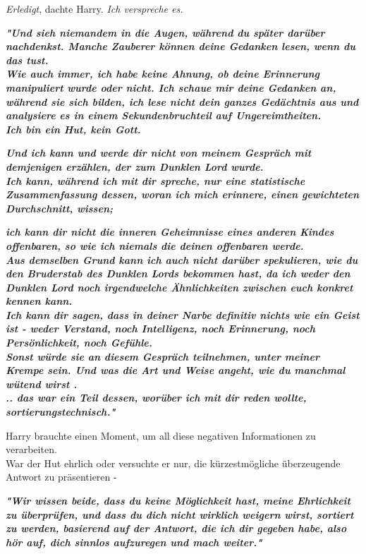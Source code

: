 {\emph{Erledigt}, dachte Harry. \emph{Ich verspreche es.}

\textbf{\emph{"Und sieh niemandem in die Augen, während du später darüber nachdenkst. Manche Zauberer können deine Gedanken lesen, wenn du das tust.\\ Wie auch immer, ich habe keine Ahnung, ob deine Erinnerung manipuliert wurde oder nicht. Ich schaue mir deine Gedanken an, während sie sich bilden, ich lese nicht dein ganzes Gedächtnis aus und analysiere es in einem Sekundenbruchteil auf Ungereimtheiten.}}\\ \textbf{\emph{\hfill\break Ich bin ein Hut, kein Gott.}}

\textbf{\emph{Und ich kann und werde dir nicht von meinem Gespräch mit demjenigen erzählen, der zum Dunklen Lord wurde.\\ Ich kann, während ich mit dir spreche, nur eine statistische Zusammenfassung dessen, woran ich mich erinnere, einen gewichteten Durchschnitt, wissen;}}

\textbf{\emph{ich kann dir nicht die inneren Geheimnisse eines anderen Kindes offenbaren, so wie ich niemals die deinen offenbaren werde.}}\\ \textbf{\emph{\hfill\break Aus demselben Grund kann ich auch nicht darüber spekulieren, wie du den Bruderstab des Dunklen Lords bekommen hast, da ich weder den Dunklen Lord noch irgendwelche Ähnlichkeiten zwischen euch konkret kennen kann.\\ Ich kann dir sagen, dass in deiner Narbe definitiv nichts wie ein Geist ist - weder Verstand, noch Intelligenz, noch Erinnerung, noch Persönlichkeit, noch Gefühle.\\ Sonst würde sie an diesem Gespräch teilnehmen, unter meiner Krempe sein. Und was die Art und Weise angeht, wie du manchmal wütend wirst .\\ .. das war ein Teil dessen, worüber ich mit dir reden wollte, sortierungstechnisch."}}

Harry brauchte einen Moment, um all diese negativen Informationen zu verarbeiten.\\ War der Hut ehrlich oder versuchte er nur, die kürzestmögliche überzeugende Antwort zu präsentieren -

\textbf{\emph{"Wir wissen beide, dass du keine Möglichkeit hast, meine Ehrlichkeit zu überprüfen, und dass du dich nicht wirklich weigern wirst, sortiert zu werden, basierend auf der Antwort, die ich dir gegeben habe, also hör auf, dich sinnlos aufzuregen und mach weiter."}}

}
